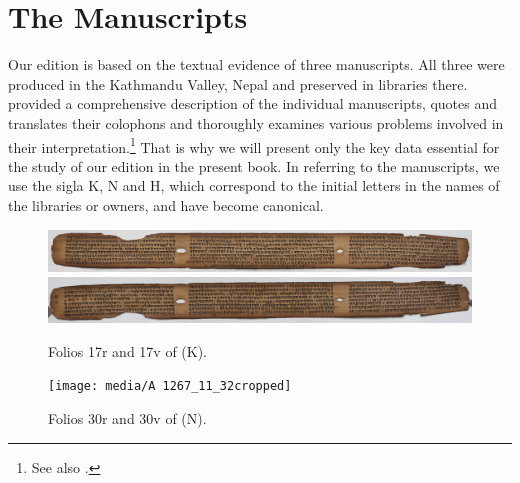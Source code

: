 \chapter{The Manuscripts}

Our edition is based on the textual evidence of three manuscripts.  All
three were produced in the Kathmandu Valley, Nepal and preserved in
libraries there. \textcites[\S 2.1]{kleb-2021b} provided a comprehensive
description of the individual manuscripts, quotes and translates their
colophons and thoroughly examines various problems involved in their
interpretation.\footnote{See also \cite{hari-2010,hari-2011,hari-2014}.}
    That is why we will present only the key data essential for the study of our
    edition in the present book. In referring to the manuscripts, we use the
    sigla K, N and H, which correspond to the initial letters in the names of
    the libraries or owners, and have become canonical.

\begin{figure}
    \centering
    \includegraphics[draft=false,width=1\linewidth]{"media/017r IMG_0065"}\\
    \includegraphics[draft=false,width=1\linewidth]{"media/017v IMG_0066"} 

    \caption{Folios 17r and 17v of  (K).}
    \label{fig:017r-img0065}

\vspace{2\baselineskip}

\texttt{[image: media/A 1267\_11\_32cropped]} 
\caption{Folios 30r and 30v of
     (N).} 
\label{fig:a45-0573274044}
      
\end{figure}

